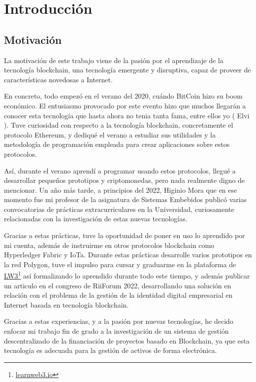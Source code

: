 \section{Introducción}
\subsection{Motivación}
La motivación de este trabajo viene de la pasión por el aprendizaje de la tecnología blockchain, una tecnología emergente y disruptiva, capaz de proveer de características novedosas a Internet.

\bigskip

En concreto, todo empezó en el verano del 2020, cuándo BitCoin hizo su boom económico. El entusiasmo provocado por este evento hizo que muchos llegarán a conocer esta tecnología que hasta ahora no tenia tanta fama, entre ellos yo ( Elvi ). Tuve curiosidad con respecto a la tecnología blockchain, concretamente el protocolo Ethereum, y dediqué el verano a estudiar sus utilidades y la metodología de programación empleada para crear aplicaciones sobre estos protocolos.

\bigskip

Así, durante el verano aprendí a programar usando estos protocolos, llegué a desarrollar pequeños prototipos y criptomonedas, pero nada realmente digno de mencionar. Un año más tarde, a principios del 2022, Higinio Mora que en ese momento fue mi profesor de la asignatura de Sistemas Embebidos publicó varias convocatorias de  prácticas extracurriculares en la Universidad, curiosamente relacionadas con la investigación de estas nuevas tecnologías.

\bigskip

Gracias a estas prácticas, tuve la oportunidad de poner en uso lo aprendido por mi cuenta, además de instruirme en otros protocolos blockchain como Hyperledger Fabric y IoTa. Durante estas prácticas desarrolle varios prototipos en la red Polygon, tuve el impulso para cursar y graduarme en la plataforma de \href{learnweb3.io/}{LW3}\footnote{\url{learnweb3.io}} así formalizando lo aprendido durante todo este tiempo, y además publicar un articulo\cite{articulo} en el congreso de RiiForum 2022, desarrollando una solución en relación con el problema de la gestión de la identidad digital empresarial en Internet basada en tecnología blockchain.

\bigskip

Gracias a estas experiencias, y a la pasión por nuevas tecnologías, he decido enfocar mi trabajo fin de grado a la investigación de un sistema de gestión descentralizado de la financiación de proyectos basado en Blockchain, ya que esta tecnología es adecuada para la gestión de activos de forma electrónica.


